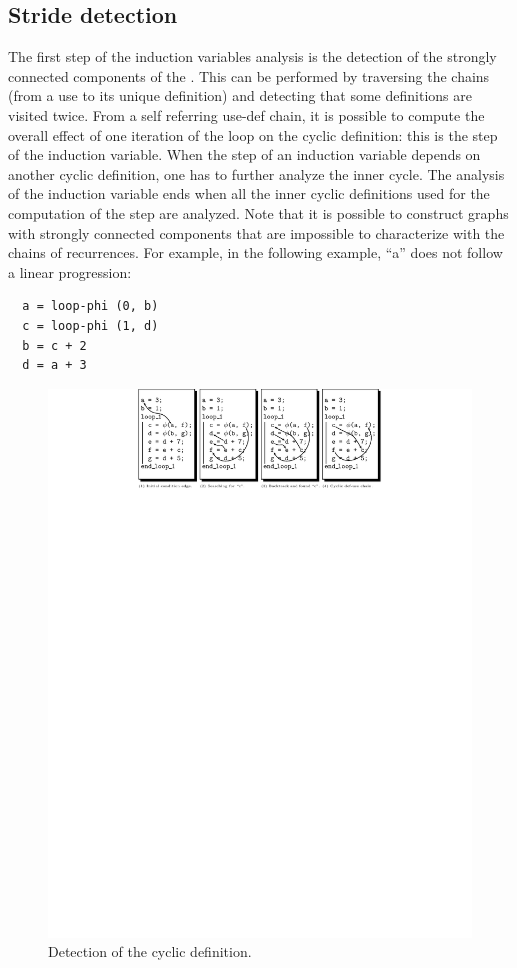\subsection{Stride detection}

The first step of the induction variables analysis is the detection of
the strongly connected components of the \SSA{}.  This can be
performed by traversing the \SSA{} chains (from a use to its unique
definition) and detecting that some definitions are visited twice.
From a self referring use-def chain, it is possible to compute the
overall effect of one iteration of the loop on the cyclic definition:
this is the step of the induction variable.  When the step of an
induction variable depends on another cyclic definition, one has to
further analyze the inner cycle.  The analysis of the induction
variable ends when all the inner cyclic definitions used for the
computation of the step are analyzed.  Note that it is possible to
construct \SSA{} graphs with strongly connected components that are
impossible to characterize with the chains of recurrences.  For
example, in the following example, ``a'' does not follow a linear
progression:
\begin{verbatim}
  a = loop-phi (0, b)
  c = loop-phi (1, d)
  b = c + 2
  d = a + 3
\end{verbatim}

\begin{figure}[h]
  \begin{center}
    \includegraphics[width=1.2\textwidth]{iv_step}
  \end{center}
  \vspace{-50em}
  \caption{Detection of the cyclic definition.}
  \label{spop:fig:ivstep}
\end{figure}

